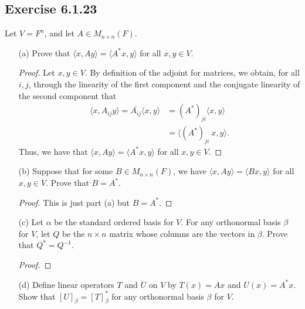 \subsection*{Exercise 6.1.23} Let \( V = F^{n} \), and let \( A \in {M}_{n \times n }(F) \). 
\begin{enumerate}
    \item[(a)] Prove that \( \langle x  , Ay \rangle = \langle A^{*} x  , y \rangle \) for all \( x,y \in V  \).
        \begin{proof}
        Let \( x,y \in V  \). By definition of the adjoint for matrices, we obtain, for all \( i,j \), through the linearity of the first component and the conjugate linearity of the second component that 
        \begin{align*}
            \langle x  ,  {A}_{ij} y  \rangle = \overline{{A}_{ij}} \langle x , y \rangle &= {(A^{*})}_{ji} \langle x , y \rangle  \\
                                                                                          &= \langle  (A^{*})_{ji} \  x  , y \rangle.
        \end{align*}
        Thus, we have that \( \langle x , Ay  \rangle = \langle A^{*} x  , y \rangle \) for all \( x,y \in V  \).
        \end{proof}
    \item[(b)] Suppose that for some \( B \in {M}_{n \times n}(F) \), we have \( \langle x  , Ay \rangle = \langle B x  , y \rangle \) for all \( x, y \in V  \). Prove that \( B = A^{*} \).
        \begin{proof}
        This is just part (a) but \( B = A^{*} \).
        \end{proof}
    \item[(c)] Let \( \alpha  \) be the standard ordered basis for \( V  \). For any orthonormal basis \( \beta  \) for \( V  \), let \( Q  \) be the \( n \times n  \) matrix whose columns are the vectors in \( \beta  \). Prove that \( Q^{*} = Q^{-1}  \).
        \begin{proof}
        
        \end{proof}
    \item[(d)] Define linear operators \( T  \) and \( U  \) on \( V  \) by \( T(x) = Ax  \) and \( U(x) = A^{*}x  \). Show that \( [U]_{\beta} = [T]^{*}_{\beta} \) for any orthonormal basis \( \beta  \) for \( V  \).
\end{enumerate}
